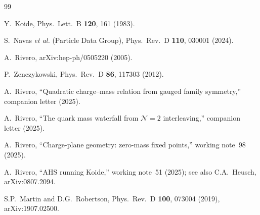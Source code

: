 \documentclass[preprint,12pt]{elsarticle}
\begin{document}
\begin{thebibliography}{99}

  Y.~Koide,
  Phys.\ Lett.\ B \textbf{120}, 161 (1983).

  S.~Navas \textit{et al.} (Particle Data Group),
  Phys.\ Rev.\ D \textbf{110}, 030001 (2024).

  A.~Rivero,
  arXiv:hep-ph/0505220 (2005).

  P.~Zenczykowski,
  Phys.\ Rev.\ D \textbf{86}, 117303 (2012).

  A.~Rivero, ``Quadratic charge--mass relation from gauged
  family symmetry,'' companion letter (2025).

  A.~Rivero, ``The quark mass waterfall from
  $\mathcal{N}{=}2$ interleaving,'' companion letter (2025).

  A.~Rivero, ``Charge-plane geometry: zero-mass fixed points,''
  working note~98 (2025).

  A.~Rivero, ``AHS running Koide,'' working note~51 (2025);
  see also C.A.~Heusch, arXiv:0807.2094.

  S.P.~Martin and D.G.~Robertson,
  Phys.\ Rev.\ D \textbf{100}, 073004 (2019),
  arXiv:1907.02500.

\end{thebibliography}
\end{document}
